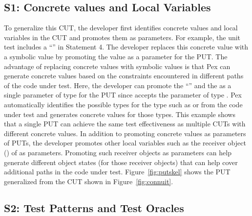 \subsection{S1: Concrete values and Local Variables}

To generalize this CUT, the developer first identifies concrete values and local variables in the CUT and promotes them as parameters. For example, the unit test includes a  ``'' in Statement 4. The developer replaces this concrete value with a symbolic value by promoting the value as a parameter for the PUT. The advantage of replacing concrete values with symbolic values is that Pex can generate concrete values based on the constraints encountered in different paths of the code under test. Here, the developer can promote the  ``'' and the   as a single parameter of type  for the PUT since  accepts the parameter of type . Pex automatically identifies the possible types for the  type such as  or  from the code under test and generates concrete values for those types. This example shows that a single PUT can achieve the same test effectiveness as multiple CUTs with different concrete values. In addition to promoting concrete values as parameters of PUTs, the developer promotes other local variables such as the receiver object () of  as parameters. Promoting such receiver objects as parameters can help generate different object states (for those receiver objects) that can help cover additional paths in the code under test. Figure~\ref{fig:putskel} shows the PUT generalized from the CUT shown in Figure~\ref{fig:connuit}.
\subsection{S2: Test Patterns and Test Oracles}

